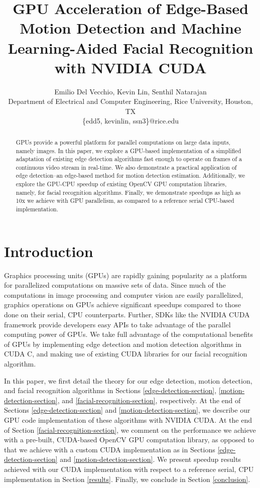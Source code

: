 \documentclass[journal]{IEEEtran}
\begin{document}
\title{GPU Acceleration of Edge-Based Motion Detection and Machine Learning-Aided Facial Recognition with NVIDIA CUDA}

\author{
	Emilio Del Vecchio, Kevin Lin, Senthil Natarajan\\
	Department of Electrical and Computer Engineering, Rice University, Houston, TX\\
	\{edd5, kevinlin, ssn3\}@rice.edu
}

\maketitle


\begin{abstract}
GPUs provide a powerful platform for parallel computations on large data inputs, namely images. In this paper, we explore a GPU-based implementation of a simplified adaptation of existing edge detection algorithms fast enough to operate on frames of a continuous video stream in real-time. We also demonstrate a practical application of edge detection--an edge-based method for motion detection estimation. Additionally, we explore the GPU-CPU speedup of existing OpenCV GPU computation libraries, namely, for facial recognition algorithms. Finally, we demonstrate speedups as high as 10x we achieve with GPU parallelism, as compared to a reference serial CPU-based implementation.
\end{abstract}


\section{Introduction}
Graphics processing units (GPUs) are rapidly gaining popularity as a platform for parallelized computations on massive sets of data. Since much of the computations in image processing and computer vision are easily parallelized, graphics operations on GPUs achieve significant speedups compared to those done on their serial, CPU counterparts. Further, SDKs like the NVIDIA CUDA framework provide developers easy APIs to take advantage of the parallel computing power of GPUs. We take full advantage of the computational benefits of GPUs by implementing edge detection and motion detection algorithms in CUDA C, and making use of existing CUDA libraries for our facial recognition algorithm.
\par In this paper, we first detail the theory for our edge detection, motion detection, and facial recognition algorithms in Sections \ref{edge-detection-section}, \ref{motion-detection-section}, and \ref{facial-recognition-section}, respectively. At the end of Sections \ref{edge-detection-section} and \ref{motion-detection-section}, we describe our GPU code implementation of these algorithms with NVIDIA CUDA. At the end of Section \ref{facial-recognition-section}, we comment on the performance we achieve with a pre-built, CUDA-based OpenCV GPU computation library, as opposed to that we achieve with a custom CUDA implementation as in Sections \ref{edge-detection-section} and \ref{motion-detection-section}. We present speedup results achieved with our CUDA implementation with respect to a reference serial, CPU implementation in Section \ref{results}. Finally, we conclude in Section \ref{conclusion}.
\end{document}

